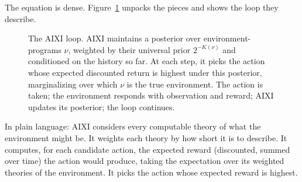 The equation is dense. Figure~\ref{fig:aixi-loop} unpacks the pieces and shows the loop they describe.

\begin{figure}[h]
\centering
{}
\caption{The AIXI loop. AIXI maintains a posterior over environment-programs $\nu$, weighted by their universal prior $2^{-K(\nu)}$ and conditioned on the history so far. At each step, it picks the action whose expected discounted return is highest under this posterior, marginalizing over which $\nu$ is the true environment. The action is taken; the environment responds with observation and reward; AIXI updates its posterior; the loop continues.}
\label{fig:aixi-loop}
\end{figure}

In plain language: AIXI considers every computable theory of what the environment might be. It weights each theory by how short it is to describe. It computes, for each candidate action, the expected reward (discounted, summed over time) the action would produce, taking the expectation over its weighted theories of the environment. It picks the action whose expected reward is highest.

